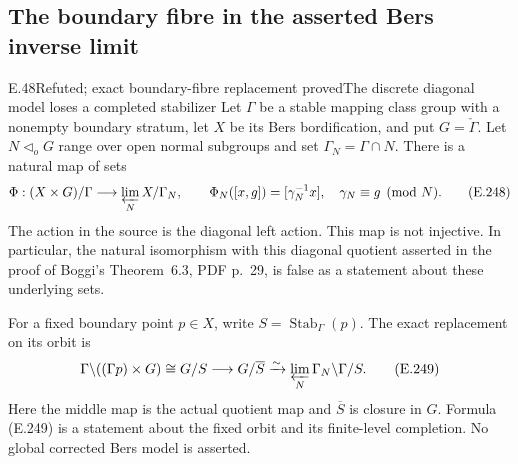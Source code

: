 \subsection{The boundary fibre in the asserted Bers inverse limit}

\begin{result}{E.48}{Refuted; exact boundary-fibre replacement proved}{The discrete diagonal model loses a completed stabilizer}
Let $\Gamma$ be a stable mapping class group with a nonempty
boundary stratum, let $X$ be its Bers bordification, and put
$G=\check\Gamma$.  Let $N\triangleleft_oG$ range over open
normal subgroups and set $\Gamma_N=\Gamma\cap N$.
There is a natural map of sets
\[
 \Phi:(X\times G)/\Gamma\longrightarrow
                 \varprojlim_N X/\Gamma_N,
 \qquad
 \Phi_N([x,g])=[\gamma_N^{-1}x],
 \quad \gamma_N\equiv g\pmod N.                 \tag{E.248}
\]
The action in the source is the diagonal left action.
This map is not injective.  In particular, the natural
isomorphism with this diagonal quotient asserted in the
proof of Boggi's Theorem~6.3, PDF p.~29,
\cite{ET_Boggi2014} is false as a statement about these
underlying sets.

For a fixed boundary point $p\in X$, write
$S=\operatorname{Stab}_\Gamma(p)$.  The exact replacement
on its orbit is
\[
 \Gamma\backslash((\Gamma p)\times G)
       \cong G/S
       \longrightarrow G/\overline S
       \xrightarrow{\sim}
           \varprojlim_N\Gamma_N\backslash\Gamma/S.
                                                               \tag{E.249}
\]
Here the middle map is the actual quotient map and
$\overline S$ is closure in $G$.  Formula (E.249) is a
statement about the fixed orbit and its finite-level
completion.  No global corrected Bers model is asserted.
\end{result}
